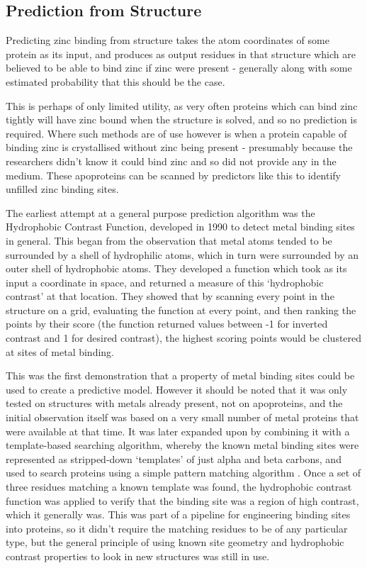 \subsection{Prediction from Structure}

Predicting zinc binding from structure takes the atom coordinates of some protein as its input, and produces as output residues in that structure which are believed to be able to bind zinc if zinc were present - generally along with some estimated probability that this should be the case.

This is perhaps of only limited utility, as very often proteins which can bind zinc tightly will have zinc bound when the structure is solved, and so no prediction is required. Where such methods are of use however is when a protein capable of binding zinc is crystallised without zinc being present - presumably because the researchers didn't know it could bind zinc and so did not provide any in the medium. These apoproteins can be scanned by predictors like this to identify unfilled zinc binding sites. 


The earliest attempt at a general purpose prediction algorithm was the Hydrophobic Contrast Function, developed in 1990 \cite{yamashita1990metal} to detect metal binding sites in general. This began from the observation that metal atoms tended to be surrounded by a shell of hydrophilic atoms, which in turn were surrounded by an outer shell of hydrophobic atoms. They developed a function which took as its input a coordinate in space, and returned a measure of this `hydrophobic contrast' at that location. They showed that by scanning every point in the structure on a grid, evaluating the function at every point, and then ranking the points by their score (the function returned values between -1 for inverted contrast and 1 for desired contrast), the highest scoring points would be clustered at sites of metal binding.

This was the first demonstration that a property of metal binding sites could be used to create a predictive model. However it should be noted that it was only tested on structures with metals already present, not on apoproteins, and the initial observation itself was based on a very small number of metal proteins that were available at that time. It was later expanded upon by combining it with a template-based searching algorithm, whereby the known metal binding sites were represented as stripped-down `templates' of just alpha and beta carbons, and used to search proteins using a simple pattern matching algorithm \cite{gregory1993prediction}. Once a set of three residues matching a known template was found, the hydrophobic contrast function was applied to verify that the binding site was a region of high contrast, which it generally was. This was part of a pipeline for engineering binding sites into proteins, so it didn't require the matching residues to be of any particular type, but the general principle of using known site geometry and hydrophobic contrast properties to look in new structures was still in use.

